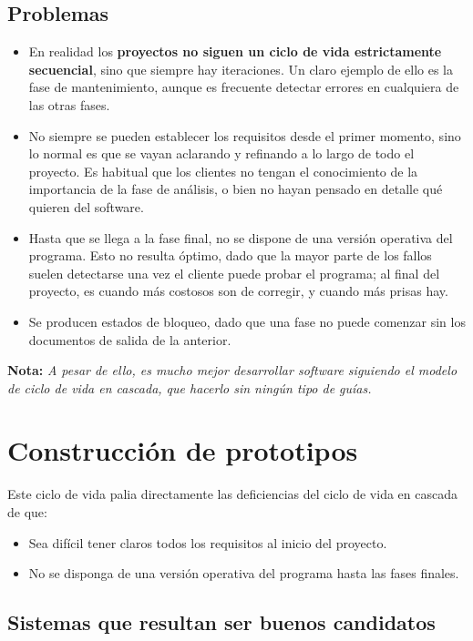 \subsection{Problemas}
\begin{itemize}
   \item En realidad los \textbf{proyectos no siguen un ciclo de vida estrictamente secuencial}, sino que siempre hay iteraciones. Un claro ejemplo de ello es la fase de mantenimiento, aunque es frecuente detectar errores en cualquiera de las otras fases. 
   \item No siempre se pueden establecer los requisitos desde el primer momento, sino lo normal es que se vayan aclarando y refinando a lo largo de todo el proyecto. Es habitual que los clientes no tengan el conocimiento de la importancia de la fase de análisis, o bien no hayan pensado en detalle qué quieren del software.
   \item Hasta que se llega a la fase final, no se dispone de una versión operativa del programa. Esto no resulta óptimo, dado que la mayor parte de los fallos suelen detectarse una vez el cliente puede probar el programa; al final del proyecto, es cuando más costosos son de corregir, y cuando más prisas hay.
   \item Se producen estados de bloqueo, dado que una fase no puede comenzar sin los documentos de salida de la anterior.
\end{itemize}

\textbf{Nota:} \textit{A pesar de ello, es mucho mejor desarrollar software siguiendo el modelo de ciclo de vida en cascada, que hacerlo sin ningún tipo de guías.}


\section{Construcción de prototipos}

Este ciclo de vida palia directamente las deficiencias del ciclo de vida en cascada de que:

\begin{itemize}
   \item Sea difícil tener claros todos los requisitos al inicio del proyecto.
   \item No se disponga de una versión operativa del programa hasta las fases finales.
\end{itemize}

\subsection{Sistemas que resultan ser buenos candidatos}

